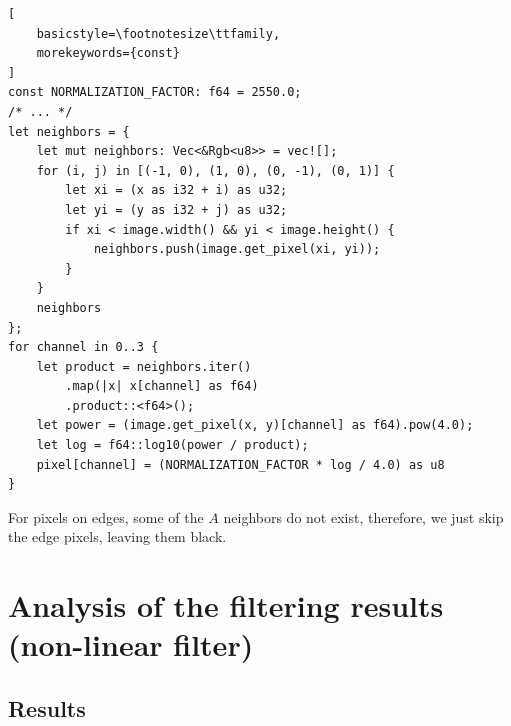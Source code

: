 \documentclass[12pt]{article}
\begin{document}
\begin{lstlisting}[
    basicstyle=\footnotesize\ttfamily,
    morekeywords={const}
]
const NORMALIZATION_FACTOR: f64 = 2550.0;
/* ... */
let neighbors = {
    let mut neighbors: Vec<&Rgb<u8>> = vec![];
    for (i, j) in [(-1, 0), (1, 0), (0, -1), (0, 1)] {
        let xi = (x as i32 + i) as u32;
        let yi = (y as i32 + j) as u32;
        if xi < image.width() && yi < image.height() {
            neighbors.push(image.get_pixel(xi, yi));
        }
    }
    neighbors
};
for channel in 0..3 {
    let product = neighbors.iter()
        .map(|x| x[channel] as f64)
        .product::<f64>();
    let power = (image.get_pixel(x, y)[channel] as f64).pow(4.0);
    let log = f64::log10(power / product);
    pixel[channel] = (NORMALIZATION_FACTOR * log / 4.0) as u8
}
\end{lstlisting}

For pixels on edges, some of the $A$ neighbors do not exist, therefore, we just skip the edge pixels, leaving them black.

\section{Analysis of the filtering results (non-linear filter)}
\subsection{Results}
\end{document}

